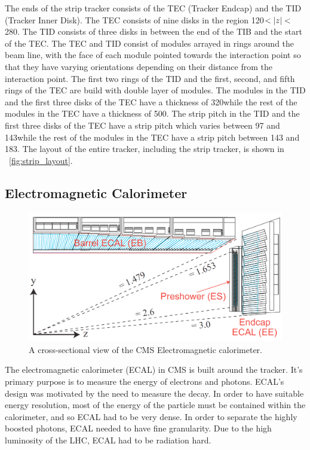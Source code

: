 The ends of the strip tracker consists of the TEC (Tracker Endcap) and the TID
(Tracker Inner Disk). The TEC consists of nine disks in the region
120\centimeters $< |z| <$ 280\centimeters. The TID consists of three
disks in between the end of the TIB and the start of the TEC. The TEC and TID
consist of modules arrayed in rings around the beam line, with the face of each
module pointed towards the interaction point so that they have varying
orientations depending on their distance from the interaction point. The first
two rings of the TID and the first, second, and fifth rings of the TEC are
build with double layer of modules. The modules in the TID and the first three
disks of the TEC have a thickness of 320\micrometers while the rest of the
modules in the TEC have a thickness of 500\micrometers. The strip pitch in the
TID and the first three disks of the TEC have a strip pitch which varies
between 97 and 143\micrometers while the rest of the modules in the TEC have a
strip pitch between 143 and 183\micrometers. The layout of the entire tracker,
including the strip tracker, is shown in \FIG~\ref{fig:strip_layout}.

\subsection{Electromagnetic Calorimeter}

\begin{figure}[tb]
    \centering
    \includegraphics[width=\textwidth]{figures/ecal_layout.png}
    \caption{A cross-sectional view of the CMS Electromagnetic calorimeter.}
    \label{fig:ecal_layout}
\end{figure}

The electromagnetic calorimeter (ECAL) in CMS is built around the tracker. It's
primary purpose is to measure the energy of electrons and photons. ECAL's
design was motivated by the need to measure the \higgstogammagamma decay. In
order to have suitable energy resolution, most of the energy of the particle
must be contained within the calorimeter, and so ECAL had to be very dense. In
order to separate the highly boosted photons, ECAL needed to have fine
granularity. Due to the high luminosity of the LHC, ECAL had to be radiation
hard.

